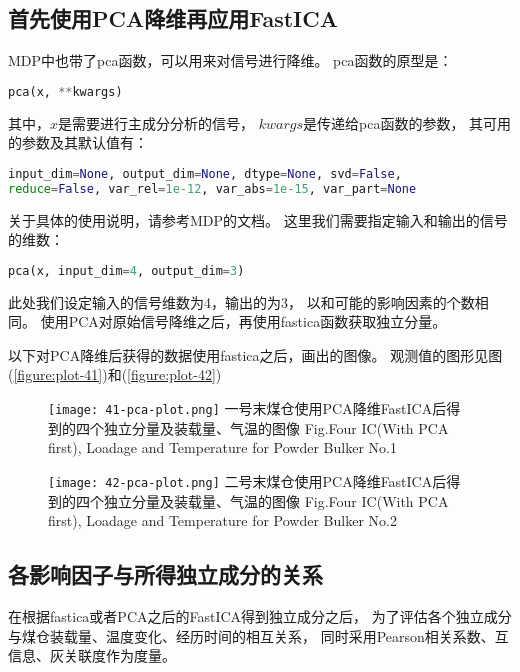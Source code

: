 \subsection{首先使用PCA降维再应用FastICA}
MDP中也带了pca函数，可以用来对信号进行降维。
pca函数的原型是：
\begin{lstlisting}[language=Python, basicstyle=\ttfamily]
pca(x, **kwargs)
\end{lstlisting}
其中，$x$是需要进行主成分分析的信号，
$kwargs$是传递给pca函数的参数，
其可用的参数及其默认值有：
\begin{lstlisting}[language=Python, basicstyle=\ttfamily]
input_dim=None, output_dim=None, dtype=None, svd=False, 
reduce=False, var_rel=1e-12, var_abs=1e-15, var_part=None
\end{lstlisting}
关于具体的使用说明，请参考MDP的文档。
这里我们需要指定输入和输出的信号的维数：
\begin{lstlisting}[language=Python, basicstyle=\ttfamily]
pca(x, input_dim=4, output_dim=3)
\end{lstlisting}
此处我们设定输入的信号维数为4，输出的为3，
以和可能的影响因素的个数相同。
使用PCA对原始信号降维之后，再使用fastica函数获取独立分量。

以下对PCA降维后获得的数据使用fastica之后，画出的图像。
观测值的图形见图(\ref{figure:plot-41})和(\ref{figure:plot-42})

\begin{figure}[!htbp]
   \centering
   \texttt{[image: 41-pca-plot.png]}
				    {一号末煤仓使用PCA降维FastICA后得到的四个独立分量及装载量、气温的图像}
			{Fig.}{Four IC(With PCA first), Loadage and Temperature for Powder Bulker No.1}
\end{figure}

\begin{figure}[!htbp]
   \centering
   \texttt{[image: 42-pca-plot.png]}
				    {二号末煤仓使用PCA降维FastICA后得到的四个独立分量及装载量、气温的图像}
			{Fig.}{Four IC(With PCA first), Loadage and Temperature for Powder Bulker No.2}
\end{figure}
\newpage

\subsection{各影响因子与所得独立成分的关系}
在根据fastica或者PCA之后的FastICA得到独立成分之后，
为了评估各个独立成分与煤仓装载量、温度变化、经历时间的相互关系，
同时采用Pearson相关系数、互信息、灰关联度作为度量。

